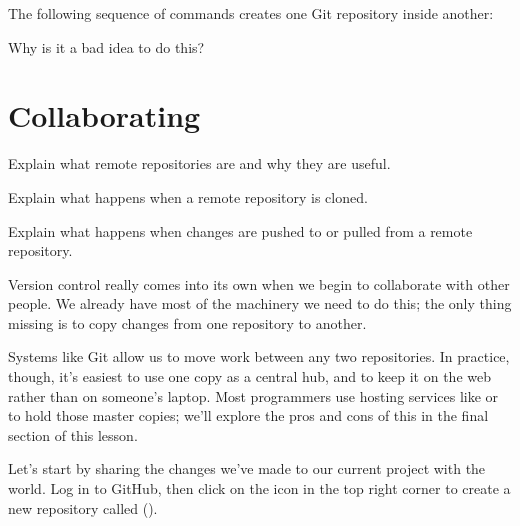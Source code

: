 \begin{challenge}
  The following sequence of commands creates one Git repository inside
  another:


  Why is it a bad idea to do this?
\end{challenge}

\section{Collaborating}

\begin{objectives}
\begin{swcitemize}
\item
  Explain what remote repositories are and why they are useful.
\item
  Explain what happens when a remote repository is cloned.
\item
  Explain what happens when changes are pushed to or pulled from a
  remote repository.
\end{swcitemize}
\end{objectives}

Version control really comes into its own when we begin to collaborate
with other people. We already have most of the machinery we need to do
this; the only thing missing is to copy changes from one repository to
another.

Systems like Git allow us to move work between any two repositories. In
practice, though, it's easiest to use one copy as a central hub, and to
keep it on the web rather than on someone's laptop. Most programmers use
hosting services like  or
 to hold those master copies;
we'll explore the pros and cons of this in the final section of this
lesson.

Let's start by sharing the changes we've made to our current project
with the world. Log in to GitHub, then click on the icon in the top
right corner to create a new repository called 
().

